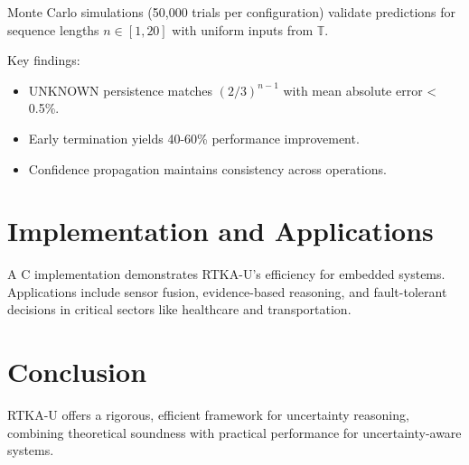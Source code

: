\documentclass[11pt,a4paper]{article}
\begin{document}
Monte Carlo simulations (50,000 trials per configuration) validate predictions for sequence lengths $n \in [1, 20]$ with uniform inputs from $\mathbb{T}$.

Key findings:
\begin{itemize}
    \item UNKNOWN persistence matches $(2/3)^{n-1}$ with mean absolute error < 0.5\%.
    \item Early termination yields 40-60\% performance improvement.
    \item Confidence propagation maintains consistency across operations.
\end{itemize}

\section{Implementation and Applications}

A C implementation demonstrates RTKA-U's efficiency for embedded systems. Applications include sensor fusion, evidence-based reasoning, and fault-tolerant decisions in critical sectors like healthcare and transportation.

\section{Conclusion}

RTKA-U offers a rigorous, efficient framework for uncertainty reasoning, combining theoretical soundness with practical performance for uncertainty-aware systems.
\end{document}
